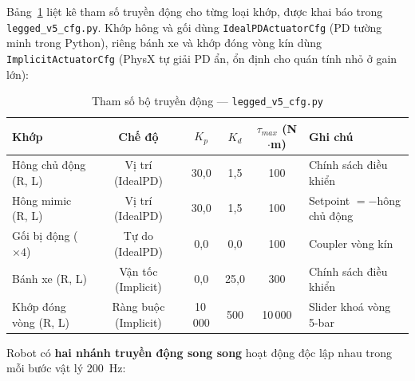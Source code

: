 Bảng~\ref{tab:actuator_params} liệt kê tham số truyền động cho từng loại
khớp, được khai báo trong \texttt{legged\_v5\_cfg.py}. Khớp hông và gối dùng
\texttt{IdealPDActuatorCfg} (PD tường minh trong Python), riêng bánh xe và
khớp đóng vòng kín dùng \texttt{ImplicitActuatorCfg} (PhysX tự giải PD ẩn,
ổn định cho quán tính nhỏ ở gain lớn):

\begin{table}[H]
    \centering
    \caption{Tham số bộ truyền động --- \texttt{legged\_v5\_cfg.py}}
    \label{tab:actuator_params}
    \renewcommand{\arraystretch}{1.3}
    \begin{tabular}{|l|c|c|c|c|l|}
    \hline
    \textbf{Khớp} & \textbf{Chế độ} & $K_p$ & $K_d$ & $\tau_{max}$ (N$\cdot$m) & \textbf{Ghi chú} \\
    \hline
    Hông chủ động (R, L)   & Vị trí (IdealPD)   & 30{,}0  & 1{,}5 & 100   & Chính sách điều khiển \\
    Hông mimic (R, L)      & Vị trí (IdealPD)   & 30{,}0  & 1{,}5 & 100   & Setpoint $=-$hông chủ động \\
    Gối bị động ($\times4$) & Tự do (IdealPD)    & 0{,}0   & 0{,}0 & 100   & Coupler vòng kín \\
    Bánh xe (R, L)         & Vận tốc (Implicit) & 0{,}0   & 25{,}0& 300   & Chính sách điều khiển \\
    Khớp đóng vòng (R, L)  & Ràng buộc (Implicit)& 10\,000 & 500   & 10\,000 & Slider khoá vòng 5-bar \\
    \hline
    \end{tabular}
\end{table}

Robot có \textbf{hai nhánh truyền động song song} hoạt động độc lập nhau
trong mỗi bước vật lý 200~Hz:


